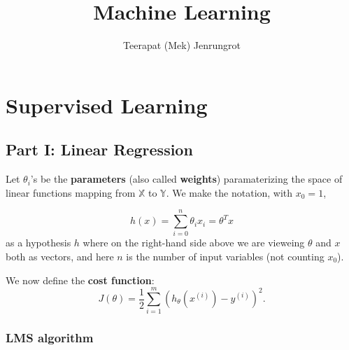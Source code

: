 \documentclass{article}
\title{Machine Learning}
\author{Teerapat (Mek) Jenrungrot}
\date{ }
\begin{document}
\maketitle

\tableofcontents

\section{Supervised Learning}
\subsection{Part I: Linear Regression}
Let $\theta_i$'s be the {\bf parameters} (also called {\bf weights}) paramaterizing the space of linear functions mapping from $\mathbb{X}$ to $\mathbb{Y}$. We make the notation, with $x_0 = 1$,

\begin{equation}
	\label{eq:hypothesis_function}
	h(x) = \sum_{i=0}^{n}\theta_i x_i = \theta^Tx
\end{equation}
as a hypothesis $h$ where on the right-hand side above we are vieweing $\theta$ and $x$ both as vectors, and here $n$ is the number of input variables (not counting $x_0$).

We now define the {\bf cost function}:
\begin{equation}
	\label{eq:cost_function}
	J(\theta) = \frac{1}{2}\sum_{i=1}^{m}(h_\theta(x^{(i)}) - y^{(i)})^2.
\end{equation}

\subsubsection{LMS algorithm}
\end{document}
